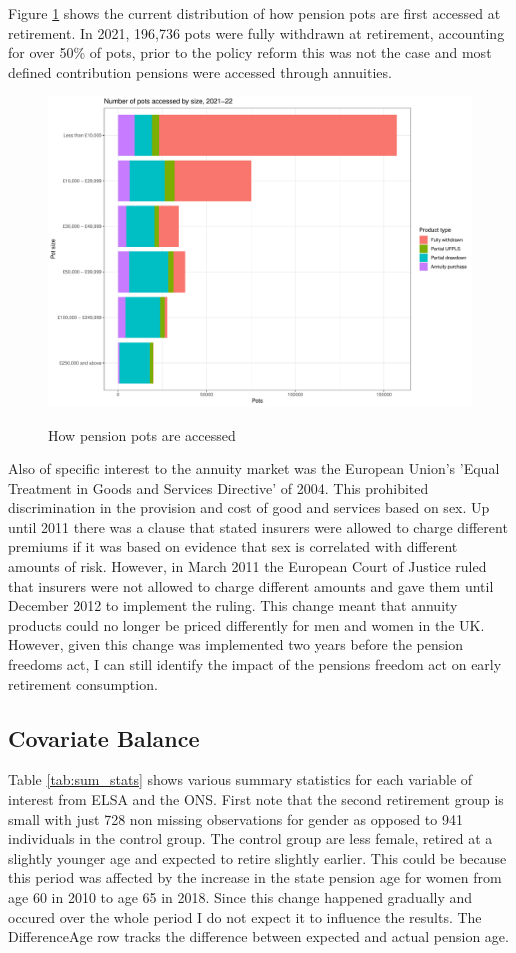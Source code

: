 \documentclass[12pt]{article}
\begin{document}
Figure \ref{fig:ann2122} shows the current distribution of how pension pots are first accessed at retirement.
In 2021, 196,736 pots were fully withdrawn at retirement, accounting for over 50\% of pots, prior to the policy
reform this was not the case and most defined contribution pensions were accessed through annuities.



\begin{figure}[h]
    \caption{How pension pots are accessed}
    \centering
    \includegraphics[width=0.7\columnwidth]{figures/annuity_pot_sizes.pdf}
    \label{fig:ann2122}
\end{figure}

Also of specific interest to the annuity market was the European Union's
'Equal Treatment in Goods and Services Directive' of 2004. This prohibited discrimination
in the provision and cost of good and services based on sex. Up until 2011 there was a clause that
stated insurers were allowed to charge different premiums if it was based on evidence that sex is
correlated with different amounts of risk. However, in March 2011 the European Court of Justice
ruled that insurers were not allowed to charge different amounts and gave them until December 2012
to implement the ruling. This change meant that annuity products could no longer be priced differently
for men and women in the UK. However, given this change was implemented two years before the pension
freedoms act, I can still identify the impact of the pensions freedom act on early retirement consumption.

\subsection{Covariate Balance}

Table \ref{tab:sum_stats} shows various summary statistics for each variable of interest from ELSA and the ONS.
First note that the second retirement group is small with just 728 non missing observations for gender as opposed
to 941 individuals in the control group. The control group are less female, retired at a slightly younger age and expected to
retire slightly earlier. This could be because this period was affected by the increase in the state pension age for
women from age 60 in 2010 to age 65 in 2018. Since this change happened gradually and occured over the whole period
I do not expect it to influence the results. The DifferenceAge row tracks the difference between expected and actual
pension age.
\end{document}
